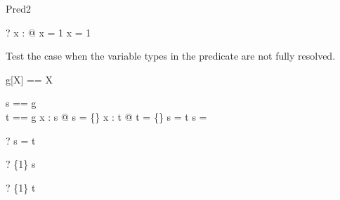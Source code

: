 \begin{zsection}
  \SECTION Pred2
\end{zsection}

\begin{zed}
  \vdash? \exists x : \nat @ x = 1 \lor x = 1
\end{zed}

Test the case when the variable types in the predicate are not fully 
resolved.
\begin{zed}
  g[X] == X
\end{zed}

\begin{axdef}
  s == g\\
  t == g
\where
  \exists x : s @ s = \{\} \land
  \exists x : t @ t = \{\} \land
  s = t \land
  s = \power \nat
\end{axdef}

\begin{zed} \vdash? s = t \end{zed}
\begin{zed} \vdash? \{1\} \in s \end{zed}
\begin{zed} \vdash? \{1\} \in t \end{zed}

